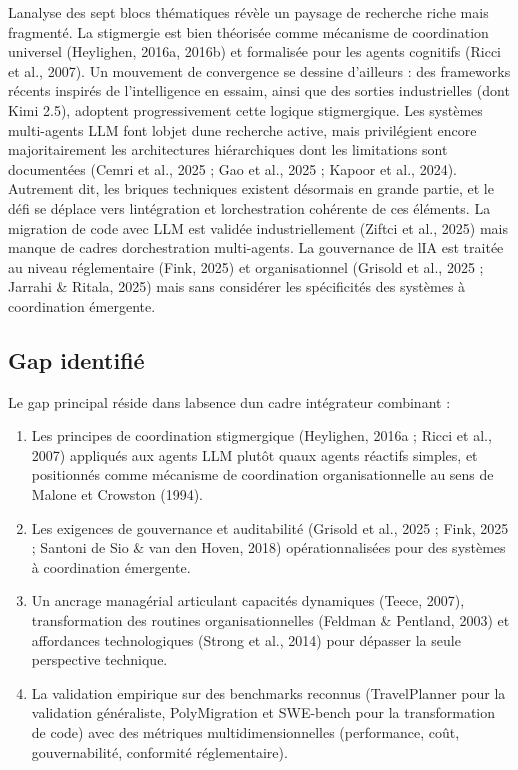 \documentclass[12pt,a4paper]{article}
\providecommand{\tightlist}{%
  \setlength{\itemsep}{0pt}\setlength{\parskip}{0pt}}
\begin{document}
L\textquotesingle analyse des sept blocs thématiques révèle un paysage
de recherche riche mais fragmenté. La stigmergie est bien théorisée
comme mécanisme de coordination universel (Heylighen, 2016a, 2016b) et
formalisée pour les agents cognitifs (Ricci et al., 2007). Un mouvement de convergence se dessine d'ailleurs : des frameworks récents inspirés de l'intelligence en essaim, ainsi que des sorties industrielles (dont Kimi 2.5), adoptent progressivement cette logique stigmergique.
Les systèmes multi-agents LLM font
l\textquotesingle objet d\textquotesingle une recherche active, mais
privilégient encore majoritairement les architectures hiérarchiques dont
les limitations sont documentées (Cemri et al., 2025 ; Gao et al., 2025
; Kapoor et al., 2024). Autrement dit, les briques techniques existent
désormais en grande partie, et le défi se déplace vers
l\textquotesingle intégration et l\textquotesingle orchestration
cohérente de ces éléments. La migration de code avec LLM est validée industriellement
(Ziftci et al., 2025) mais manque de cadres
d\textquotesingle orchestration multi-agents. La gouvernance de
l\textquotesingle IA est traitée au niveau réglementaire (Fink, 2025) et
organisationnel (Grisold et al., 2025 ; Jarrahi \& Ritala, 2025) mais
sans considérer les spécificités des systèmes à coordination émergente.

\subsection{Gap identifié}\label{gap-identifiuxe9}

Le gap principal réside dans l\textquotesingle absence
d\textquotesingle un cadre intégrateur combinant :

\begin{enumerate}
\def\labelenumi{\arabic{enumi}.}
\tightlist
\item
  Les principes de coordination stigmergique (Heylighen, 2016a ; Ricci
  et al., 2007) appliqués aux agents LLM plutôt qu\textquotesingle aux
  agents réactifs simples, et positionnés comme mécanisme de coordination
  organisationnelle au sens de Malone et Crowston (1994).
\item
  Les exigences de gouvernance et auditabilité (Grisold et al., 2025 ;
  Fink, 2025 ; Santoni de Sio \& van den Hoven, 2018) opérationnalisées
  pour des systèmes à coordination émergente.
\item
  Un ancrage managérial articulant capacités dynamiques (Teece, 2007),
  transformation des routines organisationnelles (Feldman \& Pentland,
  2003) et affordances technologiques (Strong et al., 2014) pour
  dépasser la seule perspective technique.
\item
  La validation empirique sur des benchmarks reconnus (TravelPlanner
  pour la validation généraliste, PolyMigration et SWE-bench pour la
  transformation de code) avec des métriques multidimensionnelles
  (performance, coût, gouvernabilité, conformité réglementaire).
\end{enumerate}
\end{document}
